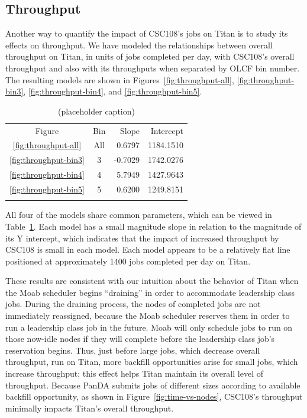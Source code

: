 \subsection{Throughput}
\label{subsec:throughput}

Another way to quantify the impact of CSC108's jobs on Titan is to study its
effects on throughput. We have modeled the relationships between overall
throughput on Titan, in units of jobs completed per day, with CSC108's overall
throughput and also with its throughputs when separated by OLCF bin number. The
resulting models are shown in Figures~\ref{fig:throughput-all},
\ref{fig:throughput-bin3}, \ref{fig:throughput-bin4}, and
\ref{fig:throughput-bin5}.

\begin{table}
\caption{(placeholder caption)}
\label{tab:throughput-params}       %
\begin{tabular}{ccrr}
\hline\noalign{\smallskip}
Figure  &   Bin & Slope   & Intercept   \\
\noalign{\smallskip}\hline\noalign{\smallskip}
\ref{fig:throughput-all}    &   All &   0.6797  &   1184.1510   \\
\ref{fig:throughput-bin3}   &   3   &  -0.7029  &   1742.0276   \\
\ref{fig:throughput-bin4}   &   4   &   5.7949  &   1427.9643   \\
\ref{fig:throughput-bin5}   &   5   &   0.6200  &   1249.8151   \\
\noalign{\smallskip}\hline
\end{tabular}
\end{table}

All four of the models share common parameters, which can be viewed in
Table~\ref{tab:throughput-params}. Each model has a small magnitude slope in
relation to the magnitude of its Y intercept, which indicates that the impact
of increased throughput by CSC108 is small in each model. Each model appears to
be a relatively flat line positioned at approximately 1400 jobs completed per
day on Titan.

These results are consistent with our intuition about the behavior of Titan
when the Moab scheduler begins ``draining'' in order to accommodate leadership
class jobs. During the draining process, the nodes of completed jobs are not
immediately reassigned, because the Moab scheduler reserves them in order to
run a leadership class job in the future. Moab will only schedule jobs to run
on those now-idle nodes if they will complete before the leadership class job's
reservation begins. Thus, just before large jobs, which decrease overall
throughput, run on Titan, more backfill opportunities arise for small jobs,
which increase throughput; this effect helps Titan maintain its overall level
of throughput. Because PanDA submits jobs of different sizes according to
available backfill opportunity, as shown in Figure~\ref{fig:time-vs-nodes},
CSC108's throughput minimally impacts Titan's overall throughput.

